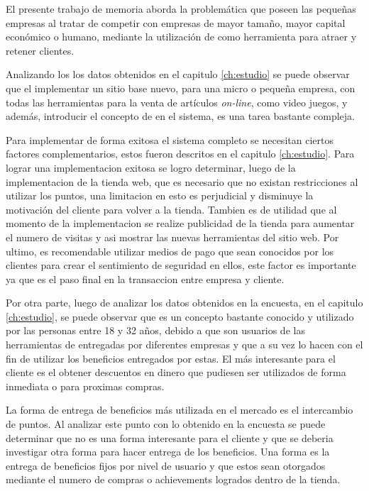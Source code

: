 El presente trabajo de memoria aborda la problemática que poseen las pequeñas
empresas al tratar de competir con empresas de mayor tamaño, mayor capital
económico o humano, mediante la utilización de {\GAM} como herramienta para atraer
y retener clientes.

Analizando los los datos obtenidos en el capitulo \ref{ch:estudio} se puede observar que el
implementar un sitio base nuevo, para una micro o pequeña empresa, con todas las
herramientas para la venta de artículos \emph{on-line}, como video juegos, y además,
introducir el concepto de {\GAM} en el sistema, es una tarea bastante compleja.

Para implementar de forma exitosa el sistema completo se necesitan ciertos factores
complementarios, estos fueron descritos en el capitulo \ref{ch:estudio}. Para lograr
una implementacion exitosa se logro determinar, luego de la implementacion de la tienda web, 
que es necesario que no existan restricciones al utilizar los puntos, una limitacion
en esto es perjudicial y disminuye la motivación del cliente para volver a la tienda. 
Tambien es de utilidad que al momento de la implementacion se realize publicidad
de la tienda para aumentar el numero de visitas y asi mostrar las nuevas herramientas
del sitio web. Por ultimo, es recomendable utilizar medios de pago que sean conocidos
por los clientes para crear el sentimiento de seguridad en ellos, este factor es importante
ya que es el paso final en la transaccion entre empresa y cliente. 

Por otra parte, luego de analizar los datos obtenidos en la encuesta, en el capitulo \ref{ch:estudio},
 se puede observar que {\GAM} es un concepto bastante conocido y utilizado por las personas 
entre 18 y 32 años, debido a que son usuarios de las herramientas de {\GAM} entregadas por
diferentes empresas y que a su vez lo hacen con el fin de utilizar los beneficios entregados 
por estas. El más interesante para el cliente es el obtener descuentos en dinero
que pudiesen ser utilizados de forma inmediata o para proximas compras.

La forma de entrega de beneficios más utilizada en el mercado es el intercambio de puntos. 
Al analizar este punto con lo obtenido en la encuesta se puede determinar que no es 
una forma interesante para el cliente y que se deberia investigar otra forma para 
hacer entrega de los beneficios. Una forma es la entrega de beneficios fijos por nivel 
de usuario y que estos sean otorgados mediante el numero de compras o achievements logrados
dentro de la tienda.

